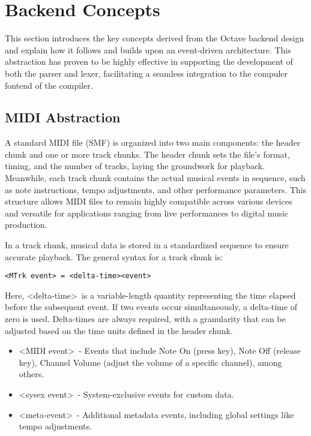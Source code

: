 \documentclass[letterpaper,12pt]{article}
\begin{document}
\section{Backend Concepts}
This section introduces the key concepts derived from the Octave backend design and explain how it follows and builds upon an event-driven architecture. This abstraction has proven to be highly effective in supporting the development of both the parser and lexer, facilitating a seamless integration to the compuler fontend of the compiler.


\subsection{MIDI Abstraction}

A standard MIDI file (SMF) is organized into two main components: the header chunk and one or more track chunks. The header chunk sets the file’s format, timing, and the number of tracks, laying the groundwork for playback. Meanwhile, each track chunk contains the actual musical events in sequence, such as note instructions, tempo adjustments, and other performance parameters. This structure allows MIDI files to remain highly compatible across various devices and versatile for applications ranging from live performances to digital music production.

In a track chunk, musical data is stored in a standardized sequence to ensure accurate playback. The general syntax for a track chunk is:


\begin{verbatim}
<MTrk event> = <delta-time><event>
\end{verbatim}

Here, \textless delta-time\textgreater\ is a variable-length quantity representing the time elapsed before the subsequent event. If two events occur simultaneously, a delta-time of zero is used. Delta-times are always required, with a granularity that can be adjusted based on the time units defined in the header chunk.

\begin{itemize}
    \item \textless MIDI event\textgreater\ - Events that include Note On (press key), Note Off (release key), Channel Volume (adjust the volume of a specific channel), among others.
    \item \textless sysex event\textgreater\ - System-exclusive events for custom data.
    \item \textless meta-event\textgreater\ - Additional metadata events, including global settings like tempo adjustments.
\end{itemize}
\end{document}
